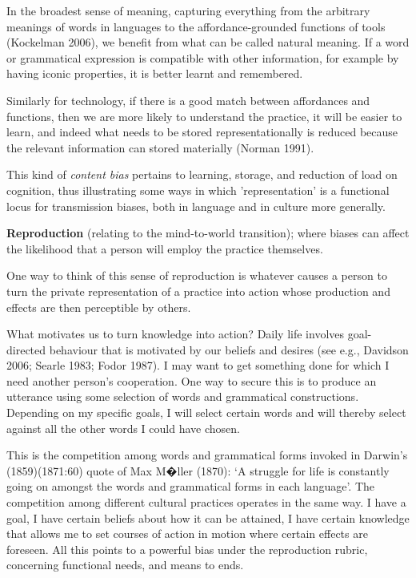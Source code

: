 In the broadest sense of meaning, capturing everything from the 
arbitrary meanings of words in languages to the affordance-grounded 
functions of tools (Kockelman 2006), we benefit from what can be called 
natural meaning. If a word or grammatical expression is compatible with 
other information, for example by having iconic properties, it is better 
learnt and remembered. 



Similarly for technology, if there is a good match between affordances 
and functions, then we are more likely to understand the practice, it 
will be easier to learn, and indeed what needs to be stored 
representationally is reduced because the relevant information can 
stored materially (Norman 1991). 



This kind of \textit{content bias} pertains to learning, storage, and 
reduction of load on cognition, thus illustrating some ways in which 
'representation' is a functional locus for transmission biases, both in 
language and in culture more generally.



\textbf{Reproduction} (relating to the mind-to-world transition); 
where biases can affect the likelihood that a person will employ the 
practice themselves.



One way to think of this sense of reproduction is whatever causes a 
person to turn the private representation of a practice into action 
whose production and effects are then perceptible by others.



What motivates us to turn knowledge into action? Daily life involves 
goal-directed behaviour that is motivated by our beliefs and desires 
(see e.g., Davidson 2006; Searle 1983; Fodor 1987). I may want to get 
something done for which I need another person's cooperation. One way to 
secure this is to produce an utterance using some selection of words and 
grammatical constructions. Depending on my specific goals, I will select 
certain words and will thereby select against all the other words I 
could have chosen. 



This is the competition among words and grammatical forms invoked in 
Darwin's (1859)(1871:60) quote of Max M�ller (1870): \textquoteleft A struggle for 
life is constantly going on amongst the words and grammatical forms in 
each language'. The competition among different cultural practices 
operates in the same way. I have a goal, I have certain beliefs about 
how it can be attained, I have certain knowledge that allows me to set 
courses of action in motion where certain effects are foreseen. All this 
points to a powerful bias under the reproduction rubric, concerning 
functional needs, and means to ends. 



